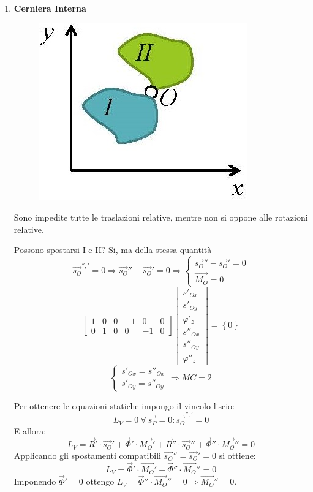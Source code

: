 \documentclass{article}
\begin{document}
\begin{adjustwidth}{2in}{}
		\begin{enumerate}
			\item \textbf{Cerniera Interna} \newline
			\begin{figure}[H]
				\centering
				\includegraphics[width=0.25\linewidth]{immagini/1.PARTE2_Pagina_03}
			\end{figure}
			Sono impedite tutte le traslazioni relative, mentre non si oppone alle rotazioni relative.
			
			Possono spostarsi I e II? Si, ma della stessa quantità
			\[
			\vec{s_O}^{'', '} = 0 \Rightarrow \vec{s_O}'' - \vec{s_O}' = 0 \Rightarrow \begin{cases}
				\vec{s_O}'' - \vec{s_O}' = 0 \\
				\vec{M_O} = 0
			\end{cases}
		\]
		\[
		\left[\begin{array}{cccccc}
			1 & 0 & 0 & -1 & 0 & 0 \\
			0 & 1 & 0 & 0 & -1 & 0
		\end{array} \right] \left[ \begin{array}{c}
		s'_{Ox} \\
		s'_{Oy} \\
		\varphi'_z \\
		s''_{Ox} \\
		s''_{Oy} \\
		\varphi''_z
	\end{array}\right] = \left\lbrace 0 \right\rbrace
		\]
			\[
			\begin{cases}
				s'_{Ox} = s''_{Ox} \\
				s'_{Oy} = s''_{Oy}
			\end{cases} \Rightarrow MC = 2
			\]
			
			Per ottenere le equazioni statiche impongo il vincolo liscio: 
			\[
			L_{V} = 0 ~ \forall ~ \vec{s_P} = 0 : \vec{s_O}^{'', '} = 0
			\]
			E allora:
			\[
				L_{V} = \vec{R}' \cdot \vec{s_O}'+ \vec{\Phi}' \cdot \vec{M_O}'+ \vec{R}'' \cdot \vec{s_O}''+ \vec{\Phi}'' \cdot \vec{M_O}'' = 0
			\]
			Applicando gli spostamenti compatibili $ \vec{s_O}'' = \vec{s_O}' = 0 $ si ottiene:
			\[
				L_{V} = \vec{\Phi}' \cdot \vec{M_O}'+ \vec{\Phi}'' \cdot \vec{M_O}'' = 0
			\]
			Imponendo $ \vec{\Phi}' = 0 $ ottengo $ L_{V} = \vec{\Phi}'' \cdot \vec{M_O}'' = 0 \Rightarrow \vec{M_O}'' = 0 $.
			

\end{enumerate}
\end{adjustwidth}
\end{document}
